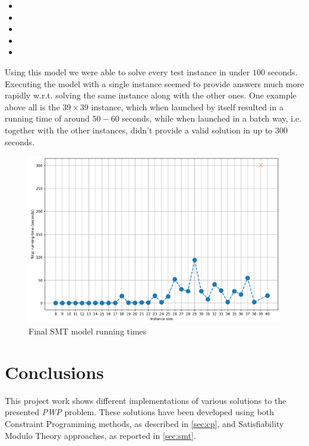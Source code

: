 \documentclass[a4paper,10pt]{article}
\begin{document}
\begin{itemize}
   \item {}
   \item {}
   \item {}
   \item {}
   \item {}
\end{itemize}

Using this model we were able to solve every test instance in under $100$ seconds. Executing the model with a single instance seemed to provide answers much more rapidly w.r.t. solving the same instance along with the other ones. One example above all is the $39 \times 39$ instance, which when launched by itself resulted in a running time of around $50-60$ seconds, while when launched in a batch way, i.e. together with the other instances, didn't provide a valid solution in up to $300$ seconds.

\begin{figure}[H]
   \centering
   \includegraphics[scale=0.45]{smt-times.png}
   \caption{Final SMT model running times}
\end{figure}

\section{Conclusions}
This project work shows different implementations of various solutions to the presented \textit{PWP} problem. These solutions have been developed using both Constraint Programming methods, as described in \ref{sec:cp}, and Satisfiability Modulo Theory approaches, as reported in \ref{sec:smt}.
\end{document}
